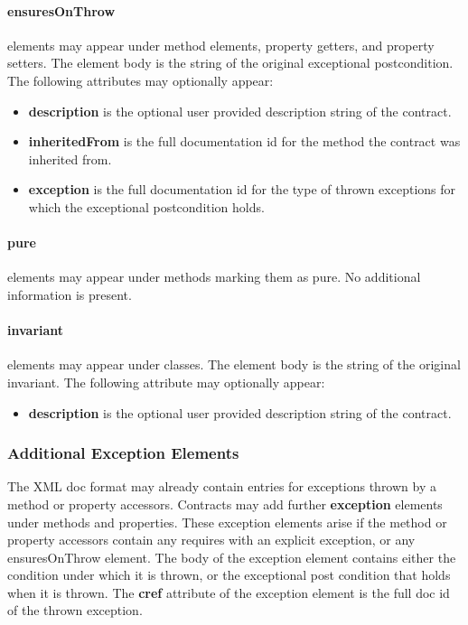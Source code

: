 \documentclass{article}
\begin{document}
\paragraph{ensuresOnThrow} elements may appear under method elements, property
getters, and property setters. The element body is the string of the
original exceptional postcondition. The following attributes may optionally appear:
\begin{itemize}
\item \textbf{description} is the optional user provided description
  string of the contract.
\item \textbf{inheritedFrom} is the full documentation id for the
  method the contract was inherited from.
\item \textbf{exception} is the full documentation id for the
  type of thrown exceptions for which the exceptional postcondition holds.
\end{itemize}

\paragraph{pure} elements may appear under methods marking them as
pure. No additional information is present.

\paragraph{invariant} elements may appear under classes. The element body is the string of the original invariant. 
The following attribute may optionally appear:
\begin{itemize}
\item \textbf{description} is the optional user provided description
  string of the contract.
\end{itemize}

\subsubsection{Additional Exception Elements}

The XML doc format may already contain entries for exceptions thrown
by a method or property accessors. Contracts may add further \textbf{exception} elements
under methods and properties. These exception elements arise if the
method or property accessors contain any requires with an explicit
exception, or any ensuresOnThrow element. The body of the exception
element contains either the condition under which it is thrown, or the
exceptional post condition that holds when it is thrown.
The \textbf{cref} attribute
of the exception element is the full doc id of the thrown exception.
\end{document}

